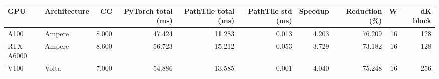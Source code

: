 \begin{tabular}{llrrrrrrrr}
\toprule
GPU & Architecture & CC & PyTorch total (ms) & PathTile total (ms) & PathTile std (ms) & Speedup & Reduction (\%) & W & dK block \\
\midrule
A100 & Ampere & 8.000 & 47.424 & 11.283 & 0.013 & 4.203 & 76.209 & 16 & 128 \\
RTX A6000 & Ampere & 8.600 & 56.723 & 15.212 & 0.053 & 3.729 & 73.182 & 16 & 128 \\
V100 & Volta & 7.000 & 54.886 & 13.585 & 0.001 & 4.040 & 75.248 & 16 & 256 \\
\bottomrule
\end{tabular}
